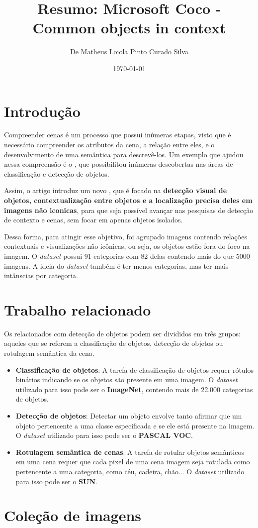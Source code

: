 \documentclass[12pt]{article}
\title{Resumo: Microsoft Coco - Common objects in context}
\author{De Matheus Loiola Pinto Curado Silva}
\date{\today}
\begin{document}
	
\maketitle

\section*{Introdução}

Compreender cenas é um processo que possui inúmeras etapas, visto que é necessário compreender os atributos da cena, a relação entre eles, e o desenvolvimento de uma semântica para descrevê-los. Um exemplo que ajudou nessa compreensão é o , que possibilitou inúmeras descobertas nas áreas de classificação e detecção de objetos. 

Assim, o artigo introduz um novo , que é focado na \textbf{detecção visual de objetos, contextualização entre objetos e a localização precisa deles em imagens não iconicas}, para que seja possível avançar nas pesquisas de detecção de contexto e cenas, sem focar em apenas objetos isolados.

Dessa forma, para atingir esse objetivo, foi agrupado imagens contendo relações contextuais e visualizações não icônicas, ou seja, os objetos estão fora do foco na imagem. O \textit{dataset} possui 91 categorias com 82 delas contendo mais do que 5000 imagens. A ideia do \textit{dataset} também é ter menos categorias, mas ter mais intânscias por categoria.

\section*{Trabalho relacionado}

Os  relacionados com detecção de objetos podem ser divididos em três grupos: aqueles que se referem a classificação de objetos, detecção de objetos ou rotulagem semântica da cena.

\begin{itemize}
    \item
    \textbf{Classificação de objetos}: A tarefa de classificação de objetos
    requer rótulos binários indicando se os objetos são presente em uma imagem. O \textit{dataset} utilizado para isso pode ser o \textbf{ImageNet}, contendo mais de 22.000 categorias de objetos.

    \item
    \textbf{Detecção de objetos}: Detectar um objeto envolve tanto afirmar que um objeto pertencente a uma classe especificada e se ele está presente na imagem. O \textit{dataset} utilizado para isso pode ser o 
    \textbf{PASCAL VOC}.

    \item
    \textbf{Rotulagem semântica de cenas}: A tarefa de rotular objetos semânticos em uma cena requer que cada pixel de uma cena imagem seja rotulada como pertencente a uma categoria, como céu, cadeira, chão...
    O \textit{dataset} utilizado para isso pode ser o \textbf{SUN}.
\end{itemize}

\section*{Coleção de imagens}
\end{document}
